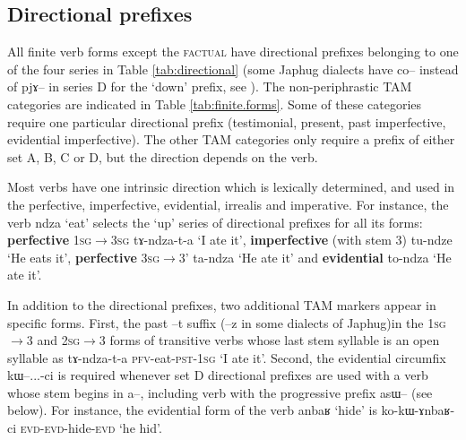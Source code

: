 \documentclass[oldfontcommands,oneside,a4paper,11pt]{article}
\newcommand{\ipa}[1]{{\phon #1}} %
\begin{document}
\subsection{Directional prefixes}
All finite verb forms except the \textsc{factual} have directional prefixes belonging to one of the four series in Table \ref{tab:directional} (some Japhug dialects have \ipa{co--} instead of \ipa{pjɤ--} in series D for the `down' prefix, see \citealt{linluo03}). The non-periphrastic TAM categories are indicated in Table \ref{tab:finite.forms}. Some of these categories require one particular directional prefix (testimonial, present, past imperfective, evidential imperfective). The other TAM categories only require a prefix of either set A, B, C or D, but the direction depends on the verb.

Most verbs have one intrinsic direction which is lexically determined, and used in the perfective, imperfective, evidential, irrealis and imperative. For instance, the verb \ipa{ndza} `eat' selects the `up' series of directional prefixes for all its forms: \textbf{perfective} \textsc{1sg$\rightarrow$3sg} \ipa{tɤ-ndza-t-a} `I ate it', \textbf{imperfective} (with stem 3) \ipa{tu-ndze} `He eats it', \textbf{perfective} \textsc{3sg$\rightarrow$3'} \ipa{ta-ndza} `He ate it' and \textbf{evidential} \ipa{to-ndza} `He ate it'. 

In addition to the directional prefixes, two additional TAM markers appear in specific forms. First, the past \ipa{--t} suffix (\ipa{--z} in some dialects of Japhug)in the \textsc{1sg}$\rightarrow$3 and \textsc{2sg}$\rightarrow$3 forms of transitive verbs whose last stem syllable is an open syllable as \ipa{tɤ-ndza-t-a} \textsc{pfv}-eat-\textsc{pst-1sg} `I ate it'. Second, the evidential circumfix \ipa{kɯ--...-ci} is required whenever set D directional prefixes are used with a verb whose stem begins in \ipa{a--}, including verb with the progressive prefix \ipa{asɯ--} (see below). For instance, the evidential form of the verb \ipa{anbaʁ} `hide' is \ipa{ko-kɯ-ɤnbaʁ-ci} \textsc{evd-evd}-hide-\textsc{evd} `he hid'.
\end{document}
